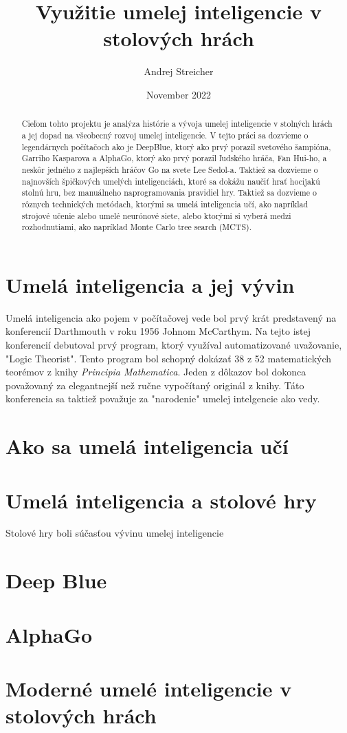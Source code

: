 \documentclass[12pt, a4paper]{article}
\begin{document}
\title{Využitie umelej inteligencie v stolových hrách}
\author{Andrej Streicher}
\date{November 2022}
\maketitle
\begin{abstract}
Cieľom tohto projektu je analýza histórie a vývoja umelej inteligencie v stolných hrách a jej dopad na všeobecný rozvoj umelej inteligencie. 
V tejto práci sa dozvieme o legendárnych počítačoch ako je DeepBlue, ktorý ako prvý porazil svetového šampióna, Garriho Kasparova a AlphaGo, ktorý ako prvý porazil ľudského hráča, Fan Hui-ho, a neskôr jedného z najlepších hráčov Go na svete Lee Sedol-a. Taktiež sa dozvieme o najnovších špičkových umelých inteligenciách, ktoré sa dokážu naučiť hrať hocijakú stolnú hru, bez manuálneho naprogramovania pravidiel hry.  
Taktiež sa dozvieme o rôznych technických metódach, ktorými sa umelá inteligencia učí, ako napríklad strojové učenie alebo umelé neurónové siete, alebo ktorými si vyberá medzi rozhodnutiami, ako napríklad Monte Carlo tree search (MCTS).
\end{abstract}
\section{Umelá inteligencia a jej vývin}
Umelá inteligencia ako pojem v počítačovej vede bol prvý krát predstavený na konferencií Darthmouth v roku 1956 Johnom McCarthym\cite{Corduck}. Na tejto istej konferencií debutoval prvý program, ktorý využíval automatizované uvažovanie, "Logic Theorist". Tento program bol schopný dokázať 38 z 52 matematických teorémov z knihy \textit{Principia Mathematica}. Jeden z dôkazov bol dokonca považovaný za elegantnejší než ručne vypočítaný originál z knihy. Táto konferencia sa taktiež považuje za "narodenie" umelej intelgencie ako vedy.\\
\section{Ako sa umelá inteligencia učí}
\section{Umelá inteligencia a stolové hry}
Stolové hry boli súčasťou vývinu umelej inteligencie 
\section{Deep Blue}
\section{AlphaGo}
\section{Moderné umelé inteligencie v stolových hrách}
{}

\end{document}
